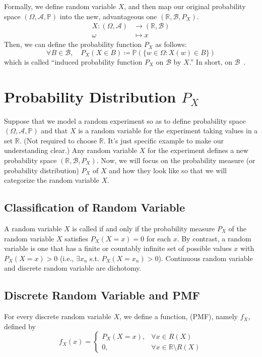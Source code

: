 \documentclass[twoside]{article}
\theoremstyle{definition}
\theoremstyle{remark}
\theoremstyle{remark}
\begin{document}
Formally, we define random variable $X$, and then map our original probability
space $(\Omega, \mathcal{A}, \mathbb{P})$ into the new, advantageous one
$(\mathbb{R}, \mathcal{B}, P_X)$.
\begin{equation}
  \begin{split}
    X: (\Omega, \mathcal{A}) &\rightarrow (\mathbb{R}, \mathcal{B}) \\
    \omega &\mapsto x
  \end{split}
\end{equation}
Then, we can define the probability function $P_X$ as follows:
\begin{equation}
  \forall B \in \mathcal{B}, \quad P_X(X \in B) \coloneqq \mathbb{P}(\{w \in \Omega : X(w) \in B\})
\end{equation}
which is called ``induced probability function $P_X$ on $\mathcal{B}$ by $X$.''
In short,  on $\mathcal{B}$~\cite{ONLINE-1}.

\section{Probability Distribution $P_X$}
Suppose that we model a random experiment so as to define probability space
$(\Omega, \mathcal{A}, \mathbb{P})$ and that $X$ is a random variable for the
experiment taking values in a set $\mathbb{R}$. (Not required to choose $\mathbb{R}$.
It's just specific example to make our understanding clear.) Any random variable $X$
for the experiment defines a new probability space $(\mathbb{R}, \mathcal{B}, P_X)$.
Now, we will focus on the probability measure (or probability distribution) $P_X$
of $X$ and how they look like so that we will categorize the random variable $X$.

\subsection{Classification of Random Variable~\cite{ONLINE-2}}
A random variable $X$ is called  if and only if the probability
measure $P_X$ of the random variable $X$ satisfies $P_X(X = x) = 0$ for each $x$.
By contrast, a  random variable is one that has a finite or
countably infinite set of possible values $x$ with $P_X(X=x) > 0$ (i.e., $\exists x_n$ s.t. $P_X(X=x_n) > 0$).
Continuous random variable and discrete random variable are dichotomy.~\cite{ONLINE-3}

\subsection{Discrete Random Variable and PMF}
For every discrete random variable $X$, we define a function,  (PMF), namely $f_X$, defined by
\begin{equation}
  f_X(x) =
  \left\{
    \begin{array}{ll}
      P_X(X = x), & \forall x \in R(X) \\
      0,         & \forall x \in \mathbb{R} \setminus R(X)
    \end{array}
  \right.
\end{equation}
\end{document}
